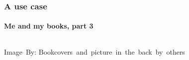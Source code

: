 \begin{frame}
	\frametitle{A use case}
	\framesubtitle{Me and my books, part 3}
	\begin{columns}
	\begin{center}
		\hspace*{15pt}\hbox{\scriptsize Image By:}
		\hspace*{15pt}\hbox{\scriptsize Bookcovers and picture in the back by others}

\end{center}
\end{columns}
\end{frame}
